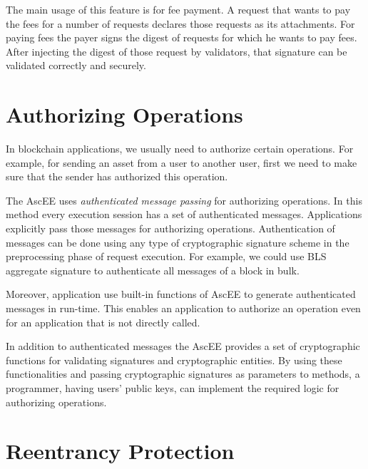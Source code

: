 The main usage of this feature is for fee payment. A request that wants to pay the fees for a number of requests
declares those requests as its attachments. For paying fees the payer signs the digest of requests for which he
wants to pay fees. After injecting the digest of those request by validators, that signature can be validated
correctly and securely.


\section{Authorizing Operations}\label{sec:authorizing-operations}

In blockchain applications, we usually need to authorize certain operations. For example, for sending an asset
from a user to another user, first we need to make sure that the sender has authorized this operation.

The AscEE uses \emph{authenticated message passing} for authorizing operations. In this method every execution
session has a set of authenticated messages. Applications explicitly pass those messages for authorizing operations.
Authentication of messages can be done using any type of cryptographic signature scheme in the preprocessing phase of
request execution. For example, we could use BLS aggregate signature to authenticate all messages of a block in bulk.

Moreover, application use built-in functions of AscEE to generate authenticated messages in run-time. This enables an
application to authorize an operation even for an application that is not directly called.


In addition to authenticated messages the AscEE provides a set of
cryptographic functions for validating signatures and cryptographic entities. By using these functionalities and
passing cryptographic signatures as parameters to methods, a programmer, having users' public keys, can implement
the required logic for authorizing operations.



\section{Reentrancy Protection}\label{sec:reentrancy}

